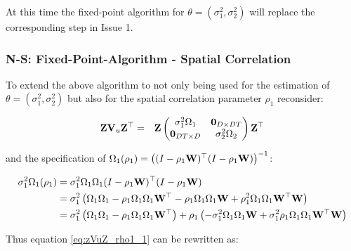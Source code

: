 At this time the fixed-point algorithm for
$\theta = (\sigma_1^2, \sigma_2^2)$ will replace the corresponding step
in Issue 1.

\subsubsection{N-S: Fixed-Point-Algorithm - Spatial
Correlation}\label{n-s-fixed-point-algorithm---spatial-correlation}

To extend the above algorithm to not only being used for the estimation
of $\theta = (\sigma_1^2, \sigma_2^2)$ but also for the spatial
correlation parameter $\rho_1$ reconsider:

\begin{eqnarray}
\label{eq:zVuZ_rho1_1}
\mathbf{Z}\mathbf{V}_u\mathbf{Z}^\top &=& \mathbf{Z}\left(\begin{matrix}
\sigma_1^2\Omega_1 & \mathbf{0}_{D\times DT}\\
\mathbf{0}_{DT\times D} &  \sigma_2^2\Omega_2
\end{matrix}\right)\mathbf{Z}^\top
\end{eqnarray}

and the specification of
$\Omega_1(\rho_1) = \left((I-\rho_1\mathbf{W})^\top(I-\rho_1\mathbf{W})\right)^{-1}$:

\begin{align}
\sigma_1^2\Omega_1(\rho_1) &= \sigma_1^2\Omega_1\Omega_1(I-\rho_1\mathbf{W})^\top(I-\rho_1\mathbf{W}) \notag\\
&= \sigma_1^2\left(\Omega_1\Omega_1 -\rho_1\Omega_1\Omega_1\mathbf{W}^\top -\rho_1\Omega_1\Omega_1\mathbf{W} + \rho_1^2\Omega_1\Omega_1\mathbf{W}^\top\mathbf{W}\right) \notag\\
&= \sigma_1^2\left(\Omega_1\Omega_1 -\rho_1\Omega_1\Omega_1\mathbf{W}^\top\right) +\rho_1 \left(-\sigma_1^2\Omega_1\Omega_1\mathbf{W} + \sigma_1^2\rho_1\Omega_1\Omega_1\mathbf{W}^\top\mathbf{W}\right) \label{eq:zVuZ_rho1_2}
\end{align}

Thus equation \ref{eq:zVuZ_rho1_1} can be rewritten as:

